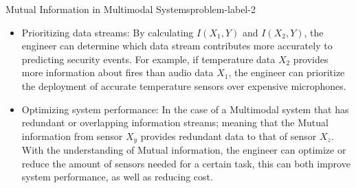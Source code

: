 \begin{problem}{Mutual Information in Multimodal Systems}{problem-label-2}
\begin{enumerate}[(a)]
\begin{enumerate}[label = (\roman*)]
				\begin{itemize}
					\item Prioritizing data streams: By calculating $I(X_1,Y)$ and $I(X_2,Y)$, the engineer can determine which data stream contributes more accurately to predicting security events. For example, if temperature data $X_2$ provides more information about fires than audio data $X_1$, the engineer can prioritize the deployment of accurate temperature sensors over expensive microphones.
					\item Optimizing system performance: In the case of a Multimodal system that has redundant or overlapping information streams; meaning that the Mutual information from sensor $X_y$ provides redundant data to that of sensor $X_z$. With the understanding of Mutual information, the engineer can optimize or reduce the amount of sensors needed for a certain task, this can both improve system performance, as well as reducing cost. 
				\end{itemize}
			\end{enumerate}
			
		\end{enumerate}

\end{problem}

